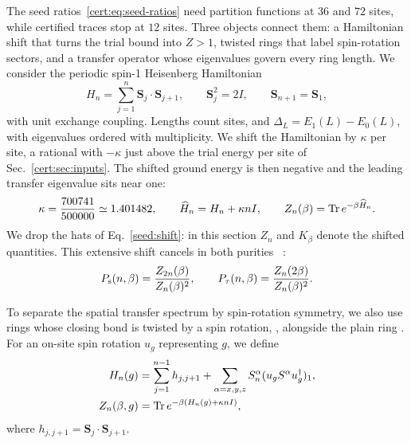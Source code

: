 The seed ratios~\eqref{cert:eq:seed-ratios} need partition functions at
$36$ and $72$ sites, while certified traces stop at $12$ sites. Three
objects connect them: a Hamiltonian shift that turns the trial bound into
$Z>1$, twisted rings that label spin-rotation sectors, and a transfer
operator whose eigenvalues govern every ring length.
We consider the periodic spin-1 Heisenberg Hamiltonian
\begin{equation}
    H_n=\sum_{j=1}^n\bm S_j\cdot\bm S_{j+1},
    \qquad \bm S_j^2=2I,\qquad \bm S_{n+1}=\bm S_1,
    \label{cert:eq:hamiltonian}
\end{equation}
with unit exchange coupling. Lengths count sites, and
$\Delta_L=E_1(L)-E_0(L)$, with eigenvalues ordered with multiplicity.
We shift the Hamiltonian by $\kappa$ per site, a rational with $-\kappa$
just above the trial energy per site of Sec.~\ref{cert:sec:inputs}. The
shifted ground energy is then negative and the leading transfer
eigenvalue sits near one:
\begin{equation}
    \kappa=\frac{700741}{500000}\simeq1.401482,\qquad
    \widehat H_n=H_n+\kappa nI,\qquad
    Z_n(\beta)=\operatorname{Tr} e^{-\beta\widehat H_n}.
    \label{cert:eq:shift}
\end{equation}
We drop the hats of Eq.~\eqref{seed:shift}: in this section $Z_n$ and
$K_\beta$ denote the shifted quantities.
This extensive shift cancels in both purities%
~:
\begin{equation}
    P_{\mathrm s}(n,\beta)=\frac{Z_{2n}(\beta)}{Z_n(\beta)^2},
    \qquad
    P_{\tau}(n,\beta)=\frac{Z_n(2\beta)}{Z_n(\beta)^2}.
    \label{cert:eq:purities}
\end{equation}

To separate the spatial transfer spectrum by spin-rotation symmetry, we
also use rings whose closing bond is twisted by a spin rotation,
, alongside the plain ring . For an on-site spin
rotation $u_g$ representing $g$, we define
\begin{align}
    H_n(g)       &=\sum_{j=1}^{n-1}h_{j,j+1}+\sum_{\alpha=x,y,z}
    S_n^\alpha(u_gS^\alpha u_g^\dagger)_1,\notag\\
    Z_n(\beta,g) &=\operatorname{Tr} e^{-\beta(H_n(g)+\kappa nI)},
    \label{cert:eq:twisted-hamiltonian}
\end{align}
where $h_{j,j+1}=\bm S_j\cdot\bm S_{j+1}$.

